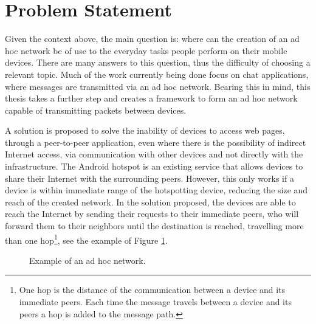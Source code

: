 \section{Problem Statement}

Given the context above, the main question is: where can the creation of an ad hoc network be of use to the everyday tasks people perform on their mobile devices. There are many answers to this question, thus the difficulty of choosing a relevant topic. Much of the work currently being done focus on chat applications, where messages are transmitted via an ad hoc network. Bearing this in mind, this thesis takes a further step and creates a framework to form an ad hoc network capable of transmitting packets between devices.

A solution is proposed to solve the inability of devices to access web pages, through a peer-to-peer application, even where there is the possibility of indirect Internet access, via communication with other devices and not directly with the infrastructure. The Android hotspot is an existing service that allows devices to share their Internet with the surrounding peers. However, this only works if a device is within immediate range of the hotspotting device, reducing the size and reach of the created network. In the solution proposed, the devices are able to reach the Internet by sending their requests to their immediate peers, who will forward them to their neighbors until the destination is reached, travelling more than one hop\footnote{One hop is the distance of the communication between a device and its immediate peers. Each time the message travels between a device and its peers a hop is added to the message path.}, see the example of Figure \ref{fig:context}.

\begin{figure}[ht]
	\noindent{}
	\caption{\label{fig:context} Example of an ad hoc network.}
\end{figure}

